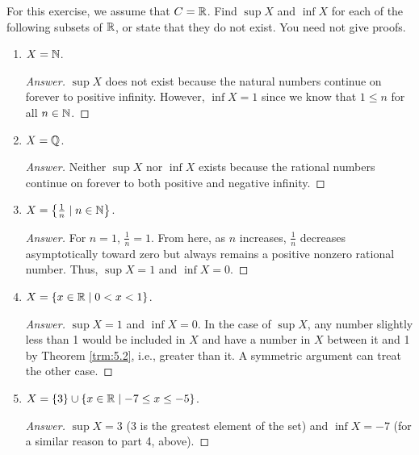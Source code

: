 \documentclass[../main.tex]{subfiles}
\begin{document}
\begin{exercise}\label{exr:5.10}
    For this exercise, we assume that $C=\mathbb{R}$. Find $\sup X$ and $\inf X$ for each of the following subsets of $\mathbb{R}$, or state that they do not exist. You need not give proofs.
    \begin{enumerate}
        \item $X=\mathbb{N}$.
        \begin{proof}[Answer]
            $\sup X$ does not exist because the natural numbers continue on forever to positive infinity. However, $\inf X=1$ since we know that $1\leq n$ for all $n\in\mathbb{N}$.
        \end{proof}
        \item $X=\mathbb{Q}$.
        \begin{proof}[Answer]
            Neither $\sup X$ nor $\inf X$ exists because the rational numbers continue on forever to both positive and negative infinity.
        \end{proof}
        \item $X=\left\{ \frac{1}{n}\mid n\in\mathbb{N} \right\}$.
        \begin{proof}[Answer]
            For $n=1$, $\frac{1}{n}=1$. From here, as $n$ increases, $\frac{1}{n}$ decreases asymptotically toward zero but always remains a positive nonzero rational number. Thus, $\sup X=1$ and $\inf X=0$.
        \end{proof}
        \item $X=\{x\in\mathbb{R}\mid 0<x<1\}$.
        \begin{proof}[Answer]
            $\sup X=1$ and $\inf X=0$. In the case of $\sup X$, any number slightly less than 1 would be included in $X$ and have a number in $X$ between it and 1 by Theorem \ref{trm:5.2}, i.e., greater than it. A symmetric argument can treat the other case.
        \end{proof}
        \item $X=\{3\}\cup\{x\in\mathbb{R}\mid-7\leq x\leq -5\}$.
        \begin{proof}[Answer]
            $\sup X=3$ (3 is the greatest element of the set) and $\inf X=-7$ (for a similar reason to part 4, above).
        \end{proof}
    \end{enumerate}
\end{exercise}
\end{document}
